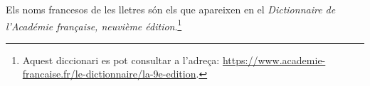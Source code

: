 Els noms francesos de les lletres són els que apareixen en el \textit{Dictionnaire de l'Académie française, neuvième édition}.\footnote{Aquest diccionari es pot consultar a l'adreça: \href{https://www.academie-francaise.fr/le-dictionnaire/la-9e-edition}{https://www.academie-francaise.fr/le-dictionnaire/la-9e-edition}.} 